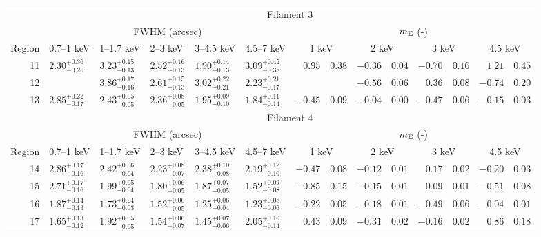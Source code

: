 \begin{tabular}{@{}rlllllr@{ $\pm$ }lr@{ $\pm$ }lr@{ $\pm$ }lr@{ $\pm$ }l@{}}
\midrule
{} & \multicolumn{13}{c}{Filament 3} \\
\cmidrule(l){2-14}
{} & \multicolumn{5}{c}{FWHM (arcsec)} & \multicolumn{8}{c}{$m_\mathrm{E}$ (-)} \\
\cmidrule(lr){2-6} \cmidrule(l){7-14}
Region & 0.7--1 keV & 1--1.7 keV & 2--3 keV & 3--4.5 keV & 4.5--7 keV
       & \multicolumn{2}{c}{1 keV} & \multicolumn{2}{c}{2 keV}
       & \multicolumn{2}{c}{3 keV} & \multicolumn{2}{c}{4.5 keV} \\
\cmidrule{1-14}
11 & ${2.30}^{+0.36}_{-0.26}$ & ${3.23}^{+0.15}_{-0.13}$ & ${2.52}^{+0.16}_{-0.13}$ & ${1.90}^{+0.14}_{-0.13}$ & ${3.09}^{+0.45}_{-0.38}$
  & $0.95$ & $0.38$ & $-0.36$ & $0.04$ & $-0.70$ & $0.16$ & $1.21$ & $0.45$ \\
12 & {} & ${3.86}^{+0.17}_{-0.16}$ & ${2.61}^{+0.15}_{-0.13}$ & ${3.02}^{+0.22}_{-0.21}$ & ${2.23}^{+0.21}_{-0.17}$
  & \multicolumn{2}{c}{} & $-0.56$ & $0.06$ & $0.36$ & $0.08$ & $-0.74$ & $0.20$ \\
13 & ${2.85}^{+0.22}_{-0.17}$ & ${2.43}^{+0.05}_{-0.05}$ & ${2.36}^{+0.08}_{-0.05}$ & ${1.95}^{+0.09}_{-0.10}$ & ${1.84}^{+0.11}_{-0.14}$
  & $-0.45$ & $0.09$ & $-0.04$ & $0.00$ & $-0.47$ & $0.06$ & $-0.15$ & $0.03$ \\


\midrule
{} & \multicolumn{13}{c}{Filament 4} \\
\cmidrule(l){2-14}
{} & \multicolumn{5}{c}{FWHM (arcsec)} & \multicolumn{8}{c}{$m_\mathrm{E}$ (-)} \\
\cmidrule(lr){2-6} \cmidrule(l){7-14}
Region & 0.7--1 keV & 1--1.7 keV & 2--3 keV & 3--4.5 keV & 4.5--7 keV
       & \multicolumn{2}{c}{1 keV} & \multicolumn{2}{c}{2 keV}
       & \multicolumn{2}{c}{3 keV} & \multicolumn{2}{c}{4.5 keV} \\
\cmidrule{1-14}
14 & ${2.86}^{+0.17}_{-0.16}$ & ${2.42}^{+0.06}_{-0.04}$ & ${2.23}^{+0.08}_{-0.07}$ & ${2.38}^{+0.10}_{-0.08}$ & ${2.19}^{+0.12}_{-0.10}$
  & $-0.47$ & $0.08$ & $-0.12$ & $0.01$ & $0.17$ & $0.02$ & $-0.20$ & $0.03$ \\
15 & ${2.71}^{+0.17}_{-0.16}$ & ${1.99}^{+0.05}_{-0.04}$ & ${1.80}^{+0.06}_{-0.05}$ & ${1.87}^{+0.07}_{-0.05}$ & ${1.52}^{+0.09}_{-0.08}$
  & $-0.85$ & $0.15$ & $-0.15$ & $0.01$ & $0.09$ & $0.01$ & $-0.51$ & $0.08$ \\
16 & ${1.87}^{+0.14}_{-0.13}$ & ${1.73}^{+0.04}_{-0.03}$ & ${1.52}^{+0.06}_{-0.05}$ & ${1.25}^{+0.06}_{-0.04}$ & ${1.23}^{+0.08}_{-0.06}$
  & $-0.22$ & $0.05$ & $-0.18$ & $0.01$ & $-0.49$ & $0.06$ & $-0.04$ & $0.01$ \\
17 & ${1.65}^{+0.13}_{-0.12}$ & ${1.92}^{+0.05}_{-0.05}$ & ${1.54}^{+0.06}_{-0.07}$ & ${1.45}^{+0.07}_{-0.06}$ & ${2.05}^{+0.16}_{-0.14}$
  & $0.43$ & $0.09$ & $-0.31$ & $0.02$ & $-0.16$ & $0.02$ & $0.86$ & $0.18$ \\


\end{tabular}
